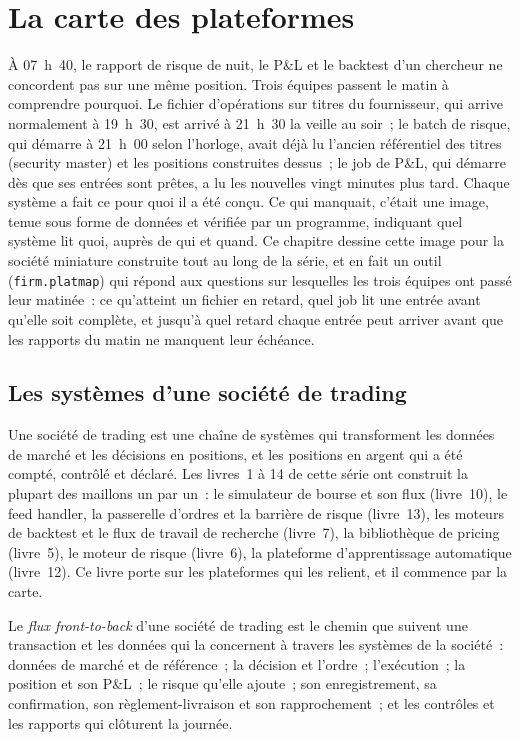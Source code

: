 \chapter{La carte des plateformes}\label{ch:pl:the-platform-map}

À 07~h~40, le rapport de risque de nuit, le P\&L et le backtest d'un chercheur ne concordent pas sur une même position. Trois équipes passent le
matin à comprendre pourquoi. Le fichier d'opérations sur titres du fournisseur, qui arrive normalement à 19~h~30, est arrivé à 21~h~30 la veille au soir~; le
batch de risque, qui démarre à 21~h~00 selon l'horloge, avait déjà lu l'ancien référentiel des titres (security master) et les positions construites dessus~; le
job de P\&L, qui démarre dès que ses entrées sont prêtes, a lu les nouvelles vingt minutes plus tard. Chaque système a fait ce pour quoi il a été conçu.
Ce qui manquait, c'était une image, tenue sous forme de données et vérifiée par un programme, indiquant quel système lit quoi, auprès de qui et quand. Ce
chapitre dessine cette image pour la société miniature construite tout au long de la série, et en fait un outil (\texttt{firm.platmap})
qui répond aux questions sur lesquelles les trois équipes ont passé leur matinée~: ce qu'atteint un fichier en retard, quel job lit une entrée avant
qu'elle soit complète, et jusqu'à quel retard chaque entrée peut arriver avant que les rapports du matin ne manquent leur échéance.

\section{Les systèmes d'une société de trading}

Une société de trading est une chaîne de systèmes qui transforment les données de marché et les décisions en positions, et les positions en argent qui a
été compté, contrôlé et déclaré. Les livres~1 à 14 de cette série ont construit la plupart des maillons un par un~: le simulateur de bourse
et son flux (livre~10), le feed handler, la passerelle d'ordres et la barrière de risque (livre~13), les moteurs de backtest et le flux de travail
de recherche (livre~7), la bibliothèque de pricing (livre~5), le moteur de risque (livre~6), la plateforme d'apprentissage automatique (livre~12). Ce livre porte sur
les plateformes qui les relient, et il commence par la carte.

\begin{definition}\label{def:pl:the-platform-map:ftb}
Le \emph{flux front-to-back} d'une société de trading est le chemin que suivent une transaction et les données qui la concernent
à travers les systèmes de la société~: données de marché et de référence~; la décision et l'ordre~; l'exécution~; la position et son P\&L~;
le risque qu'elle ajoute~; son enregistrement, sa confirmation, son règlement-livraison et son rapprochement~; et les contrôles et les rapports qui clôturent la journée.
\end{definition}

